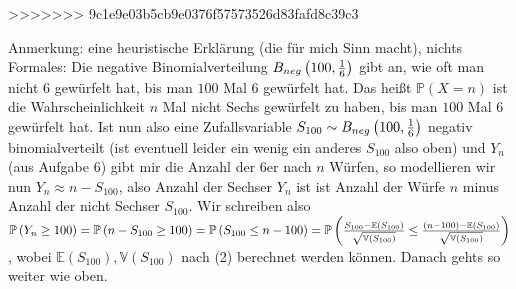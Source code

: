 \begin{solution}
>>>>>>> 9c1e9e03b5cb9e0376f57573526d83fafd8c39c3

Anmerkung: eine heuristische Erklärung (die für mich Sinn macht), nichts Formales: Die negative Binomialverteilung $B_{neg}\left ( 100,\frac{1}{6} \right )$ gibt an, wie oft man nicht $6$ gewürfelt hat, bis man $100$ Mal $6$ gewürfelt hat. Das heißt $\mathbb{P}(X=n)$ ist die Wahrscheinlichkeit $n$ Mal nicht Sechs gewürfelt zu haben, bis man $100$ Mal 6 gewürfelt hat. Ist nun also eine Zufallsvariable $S_{100} \sim B_{neg}\left ( 100,\frac{1}{6} \right )$ negativ binomialverteilt (ist eventuell leider ein wenig ein anderes $S_{100}$ also oben) und $Y_n$ (aus Aufgabe 6) gibt mir die Anzahl der $6$er nach $n$ Würfen, so modellieren wir nun $Y_n \approx n - S_{100}$, also Anzahl der Sechser $Y_n$ ist ist Anzahl der Würfe $n$ minus Anzahl der nicht Sechser $S_{100}$. Wir schreiben also $\mathbb{P}\left ( Y_n \geq 100 \right ) = \mathbb{P}\left ( n - S_{100} \geq 100 \right ) = \mathbb{P}\left ( S_{100} \leq n - 100 \right ) = \mathbb{P}\left ( \frac{S_{100} - \mathbb{E}(S_{100})}{\sqrt{\mathbb{V}(S_{100})}} \leq \frac{(n-100) - \mathbb{E}(S_{100})}{\sqrt{\mathbb{V}(S_{100})}} \right )$, wobei $\mathbb{E}(S_{100}),\mathbb{V}(S_{100})$ nach (2) berechnet werden können. Danach gehts so weiter wie oben.
\end{solution}
